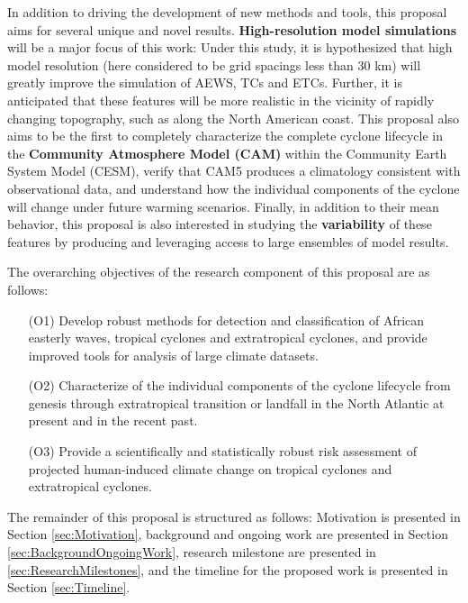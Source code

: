 \documentclass[11pt]{article}
\begin{document}
In addition to driving the development of new methods and tools, this proposal aims for several unique and novel results.  \textbf{High-resolution model simulations} will be a major focus of this work:  Under this study, it is hypothesized that high model resolution (here considered to be grid spacings less than 30 km) will greatly improve the simulation of AEWS, TCs and ETCs.  Further, it is anticipated that these features will be more realistic in the vicinity of rapidly changing topography, such as along the North American coast.  This proposal also aims to be the first to completely characterize the complete cyclone lifecycle in the \textbf{Community Atmosphere Model (CAM)} within the Community Earth System Model (CESM), verify that CAM5 produces a climatology consistent with observational data, and understand how the individual components of the cyclone will change under future warming scenarios.  Finally, in addition to their mean behavior, this proposal is also interested in studying the \textbf{variability} of these features by producing and leveraging access to large ensembles of model results.

The overarching objectives of the research component of this proposal are as follows: 

\begin{enumerate}
\item[(O1)] Develop robust methods for detection and classification of African easterly waves, tropical cyclones and extratropical cyclones, and provide improved tools for analysis of large climate datasets.

\item[(O2)] Characterize of the individual components of the cyclone lifecycle from genesis through extratropical transition or landfall in the North Atlantic at present and in the recent past.

\item[(O3)] Provide a scientifically and statistically robust risk assessment of projected human-induced climate change on tropical cyclones and extratropical cyclones.
\end{enumerate}

The remainder of this proposal is structured as follows: Motivation is presented in Section \ref{sec:Motivation}, background and ongoing work are presented in Section \ref{sec:BackgroundOngoingWork}, research milestone are presented in \ref{sec:ResearchMilestones}, and the timeline for the proposed work is presented in Section \ref{sec:Timeline}.
\end{document}
